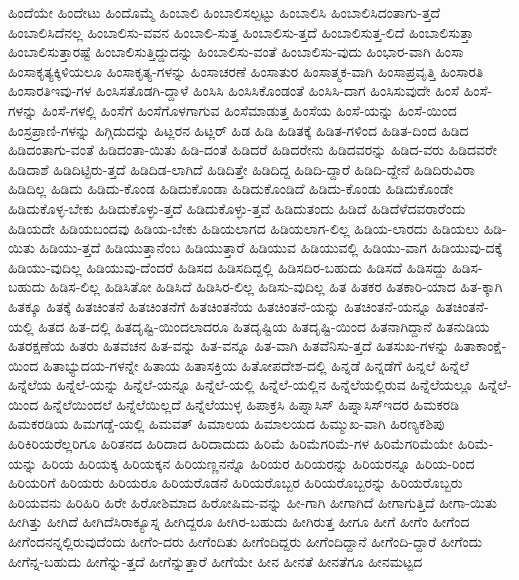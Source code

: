 {ಹಿಂದೆಯೇ
ಹಿಂದೇಟು
ಹಿಂದೊಮ್ಮೆ
ಹಿಂಬಾಲಿ
ಹಿಂಬಾಲಿಸಲ್ಪಟ್ಟು
ಹಿಂಬಾಲಿಸಿ
ಹಿಂಬಾಲಿಸಿದಂತಾಗು-ತ್ತದೆ
ಹಿಂಬಾಲಿಸಿದೆನಲ್ಲ
ಹಿಂಬಾಲಿಸು-ವವನ
ಹಿಂಬಾಲಿ-ಸುತ್ತ
ಹಿಂಬಾಲಿಸು-ತ್ತದೆ
ಹಿಂಬಾಲಿಸುತ್ತ-ಲಿದೆ
ಹಿಂಬಾಲಿಸುತ್ತಾ
ಹಿಂಬಾಲಿಸುತ್ತಾರಷ್ಟೆ
ಹಿಂಬಾಲಿಸುತ್ತಿದ್ದುದನ್ನು
ಹಿಂಬಾಲಿಸು-ವಂತೆ
ಹಿಂಬಾಲಿಸು-ವುದು
ಹಿಂಭಾರ-ವಾಗಿ
ಹಿಂಸಾ
ಹಿಂಸಾಕೃತ್ಯಕ್ಕಿಳಿಯಲೂ
ಹಿಂಸಾಕೃತ್ಯ-ಗಳನ್ನು
ಹಿಂಸಾಚರಣೆ
ಹಿಂಸಾತುರ
ಹಿಂಸಾತ್ಮಕ-ವಾಗಿ
ಹಿಂಸಾಪ್ರವೃತ್ತಿ
ಹಿಂಸಾರತಿ
ಹಿಂಸಾರತಿಇವು-ಗಳ
ಹಿಂಸಿಸತೊಡಗಿ-ದ್ದಾಳೆ
ಹಿಂಸಿಸಿ
ಹಿಂಸಿಸಿಕೊಂಡಂತೆ
ಹಿಂಸಿಸಿ-ದಾಗ
ಹಿಂಸಿಸುವುದೇ
ಹಿಂಸೆ
ಹಿಂಸೆ-ಗಳನ್ನು
ಹಿಂಸೆ-ಗಳಲ್ಲಿ
ಹಿಂಸೆಗೆ
ಹಿಂಸೆಗೊಳಗಾಗುವ
ಹಿಂಸೆಮಾಡುತ್ತ
ಹಿಂಸೆಯ
ಹಿಂಸೆ-ಯನ್ನು
ಹಿಂಸೆ-ಯಿಂದ
ಹಿಂಸ್ರಪ್ರಾಣಿ-ಗಳನ್ನು
ಹಿಗ್ಗಿದುದನ್ನು
ಹಿಟ್ಲರನ
ಹಿಟ್ಲರ್
ಹಿಡ
ಹಿಡಿ
ಹಿಡಿತಕ್ಕೆ
ಹಿಡಿತ-ಗಳಿಂದ
ಹಿಡಿತ-ದಿಂದ
ಹಿಡಿದ
ಹಿಡಿದಂತಾಗು-ವಂತೆ
ಹಿಡಿದಂತಾ-ಯಿತು
ಹಿಡಿ-ದಂತೆ
ಹಿಡಿದರೆ
ಹಿಡಿದರೇನು
ಹಿಡಿದವರನ್ನು
ಹಿಡಿದ-ವರು
ಹಿಡಿದವರೇ
ಹಿಡಿದಾಶೆ
ಹಿಡಿದಿಟ್ಟಿರು-ತ್ತದೆ
ಹಿಡಿದಿಡ-ಲಾಗಿದೆ
ಹಿಡಿದಿತ್ತೇ
ಹಿಡಿದಿದ್ದ
ಹಿಡಿದಿ-ದ್ದಾರೆ
ಹಿಡಿದಿ-ದ್ದೇನೆ
ಹಿಡಿದಿರುವಿರಾ
ಹಿಡಿದಿಲ್ಲ
ಹಿಡಿದು
ಹಿಡಿದು-ಕೊಂಡ
ಹಿಡಿದುಕೊಂಡಾ
ಹಿಡಿದುಕೊಂಡಿದೆ
ಹಿಡಿದು-ಕೊಂಡು
ಹಿಡಿದುಕೊಂಡೇ
ಹಿಡಿದುಕೊಳ್ಳ-ಬೇಕು
ಹಿಡಿದುಕೊಳ್ಳು-ತ್ತದೆ
ಹಿಡಿದುಕೊಳ್ಳು-ತ್ತವೆ
ಹಿಡಿದುತಂದು
ಹಿಡಿದೆ
ಹಿಡಿದೆಳೆದವರಾರೆಂದು
ಹಿಡಿಯದೇ
ಹಿಡಿಯಬಂದವು
ಹಿಡಿಯ-ಬೇಕು
ಹಿಡಿಯಲಾಗದ
ಹಿಡಿಯಲಾಗ-ಲಿಲ್ಲ
ಹಿಡಿಯ-ಲಾರದು
ಹಿಡಿಯಲು
ಹಿಡಿ-ಯಿತು
ಹಿಡಿಯು-ತ್ತದೆ
ಹಿಡಿಯುತ್ತಾನೆಂಬ
ಹಿಡಿಯುತ್ತಾರೆ
ಹಿಡಿಯುವ
ಹಿಡಿಯುವಲ್ಲಿ
ಹಿಡಿಯು-ವಾಗ
ಹಿಡಿಯುವು-ದಕ್ಕೆ
ಹಿಡಿಯು-ವುದಿಲ್ಲ
ಹಿಡಿಯುವು-ದೆಂದರೆ
ಹಿಡಿಸದ
ಹಿಡಿಸದಿದ್ದಲ್ಲಿ
ಹಿಡಿಸದಿರ-ಬಹುದು
ಹಿಡಿಸದೆ
ಹಿಡಿಸದ್ದು
ಹಿಡಿಸ-ಬಹುದು
ಹಿಡಿಸ-ಲಿಲ್ಲ
ಹಿಡಿಸಿತೋ
ಹಿಡಿಸಿದೆ
ಹಿಡಿಸಿರ-ಲಿಲ್ಲ
ಹಿಡಿಸು-ವುದಿಲ್ಲ
ಹಿತ
ಹಿತಕರ
ಹಿತಕಾರಿ-ಯಾದ
ಹಿತ-ಕ್ಕಾಗಿ
ಹಿತಕ್ಕೂ
ಹಿತಕ್ಕೆ
ಹಿತಚಿಂತನೆ
ಹಿತಚಿಂತನೆಗೆ
ಹಿತಚಿಂತನೆಯ
ಹಿತಚಿಂತನೆ-ಯನ್ನು
ಹಿತಚಿಂತನೆ-ಯನ್ನೂ
ಹಿತಚಿಂತನೆ-ಯಲ್ಲಿ
ಹಿತದ
ಹಿತ-ದಲ್ಲಿ
ಹಿತದೃಷ್ಟಿ-ಯಿಂದಲಾದರೂ
ಹಿತದೃಷ್ಟಿಯ
ಹಿತದೃಷ್ಟಿ-ಯಿಂದ
ಹಿತನಾಗಿದ್ದಾನೆ
ಹಿತನುಡಿಯ
ಹಿತರಕ್ಷಣೆಯ
ಹಿತರು
ಹಿತವಚನ
ಹಿತ-ವನ್ನು
ಹಿತ-ವನ್ನೂ
ಹಿತ-ವಾಗಿ
ಹಿತವೆನಿಸು-ತ್ತದೆ
ಹಿತಸುಖ-ಗಳನ್ನು
ಹಿತಾಕಾಂಕ್ಷೆ-ಯಿಂದ
ಹಿತಾಭ್ಯುದಯ-ಗಳನ್ನೇ
ಹಿತಾಯ
ಹಿತಾಸಕ್ತಿಯ
ಹಿತೋಪದೇಶ-ದಲ್ಲಿ
ಹಿನ್ನಡೆ
ಹಿನ್ನಡೆಗೆ
ಹಿನ್ನಲೆ
ಹಿನ್ನೆಲೆ
ಹಿನ್ನೆಲೆಯ
ಹಿನ್ನೆಲೆ-ಯನ್ನು
ಹಿನ್ನೆಲೆ-ಯನ್ನೂ
ಹಿನ್ನೆಲೆ-ಯಲ್ಲಿ
ಹಿನ್ನೆಲೆ-ಯಲ್ಲಿನ
ಹಿನ್ನೆಲೆಯಲ್ಲಿರುವ
ಹಿನ್ನೆಲೆಯಲ್ಲೂ
ಹಿನ್ನೆಲೆ-ಯಿಂದ
ಹಿನ್ನೆಲೆಯಿಂದಲೆ
ಹಿನ್ನೆಲೆಯಿಲ್ಲದೆ
ಹಿನ್ನೆಲೆಯುಳ್ಳ
ಹಿಪಾಕ್ರಸಿ
ಹಿಪ್ನಾಸಿಸ್
ಹಿಪ್ನಾಸಿಸ್ಇದರ
ಹಿಮಕರಡಿ
ಹಿಮಕರಡಿಯ
ಹಿಮಗಡ್ಡೆ-ಯಲ್ಲಿ
ಹಿಮವತ್
ಹಿಮಾಲಯ
ಹಿಮಾಲಯದ
ಹಿಮ್ಮುಖ-ವಾಗಿ
ಹಿರಣ್ಯಕಶಿಪು
ಹಿರಿಕಿರಿಯರೆಲ್ಲರಿಗೂ
ಹಿರಿತನದ
ಹಿರಿದಾದ
ಹಿರಿದಾದುದು
ಹಿರಿಮೆ
ಹಿರಿಮೆಗರಿಮೆ-ಗಳ
ಹಿರಿಮೆಗರಿಮೆಯೇ
ಹಿರಿಮೆ-ಯನ್ನು
ಹಿರಿಯ
ಹಿರಿಯಕ್ಕ
ಹಿರಿಯಕ್ಕನ
ಹಿರಿಯಣ್ಣನನ್ನೊ
ಹಿರಿಯರ
ಹಿರಿಯರನ್ನು
ಹಿರಿಯರನ್ನೂ
ಹಿರಿಯ-ರಿಂದ
ಹಿರಿಯರಿಗೆ
ಹಿರಿಯರು
ಹಿರಿಯರೂ
ಹಿರಿಯರೊಡನೆ
ಹಿರಿಯರೊಬ್ಬರ
ಹಿರಿಯರೊಬ್ಬರನ್ನು
ಹಿರಿಯರೊಬ್ಬರು
ಹಿರಿಯವನು
ಹಿರಿಹಿರಿ
ಹಿರೇ
ಹಿರೋಶಿಮಾದ
ಹಿರೋಷಿಮ-ವನ್ನು
ಹೀ-ಗಾಗಿ
ಹೀಗಾಗಿದೆ
ಹೀಗಾಗುತ್ತಿದೆ
ಹೀಗಾ-ಯಿತು
ಹೀಗಿತ್ತು
ಹೀಗಿದೆ
ಹೀಗಿದೆಸಿರಾಕ್ಯೂಸ್ನ
ಹೀಗಿದ್ದರೂ
ಹೀಗಿರ-ಬಹುದು
ಹೀಗಿರುತ್ತ
ಹೀಗೂ
ಹೀಗೆ
ಹೀಗೆಂ
ಹೀಗೆಂದ
ಹೀಗೆಂದನನ್ನಲ್ಲಿರುವುದೆಂದು
ಹೀಗೆಂ-ದರು
ಹೀಗೆಂದಿತು
ಹೀಗೆಂದಿದ್ದರು
ಹೀಗೆಂದಿದ್ದಾನೆ
ಹೀಗೆಂದಿ-ದ್ದಾರೆ
ಹೀಗೆಂದು
ಹೀಗೆನ್ನ-ಬಹುದು
ಹೀಗೆನ್ನು-ತ್ತದೆ
ಹೀಗೆನ್ನುತ್ತಾರೆ
ಹೀಗೆಯೇ
ಹೀನ
ಹೀನತೆ
ಹೀನತೆಗೂ
ಹೀನಮಟ್ಟದ
}
